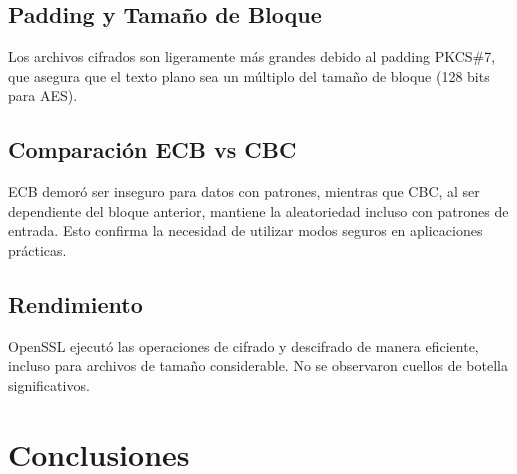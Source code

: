 \documentclass[11pt,a4paper]{article}
\begin{document}
\subsection{Padding y Tamaño de Bloque}

Los archivos cifrados son ligeramente más grandes debido al padding PKCS\#7, que asegura que el texto plano sea un múltiplo del tamaño de bloque (128 bits para AES).

\subsection{Comparación ECB vs CBC}

ECB demoró ser inseguro para datos con patrones, mientras que CBC, al ser dependiente del bloque anterior, mantiene la aleatoriedad incluso con patrones de entrada. Esto confirma la necesidad de utilizar modos seguros en aplicaciones prácticas.

\subsection{Rendimiento}

OpenSSL ejecutó las operaciones de cifrado y descifrado de manera eficiente, incluso para archivos de tamaño considerable. No se observaron cuellos de botella significativos.

\section{Conclusiones}
\end{document}
